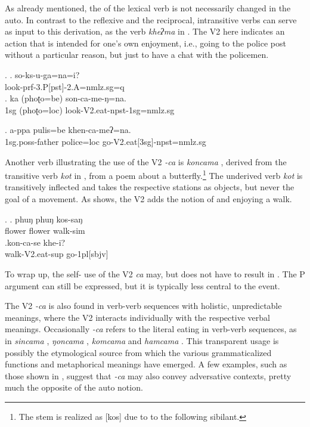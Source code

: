 As already mentioned, the  of the lexical verb is not necessarily changed in the auto. In contrast to the reflexive and the reciprocal,  intransitive verbs can serve as input to this derivation, as the verb \emph{kheʔma}  in \NNext. The V2 here indicates an action that is intended for one's own enjoyment, i.e., going to the police post without a particular reason, but just to have a chat with the policemen.

\ex. \ag.  so-ks-u-ga=na=i?\\
look{\sc -prf-3.P[pst]-2.A=nmlz.sg=q}\\
	\bg. ka (phoʈo=be) son-ca-me-ŋ=na.\\
	{\sc 1sg} (phoʈo{\sc =loc}) look{\sc -V2.eat-npst-1sg=nmlz.sg}\\


\exg. a-ppa pulis=be khen-ca-meʔ=na.\\
	{\sc 1sg.poss}-father police{\sc =loc} go{\sc -V2.eat[3sg]-npst=nmlz.sg}\\


Another verb illustrating the use of the V2 \emph{-ca} is \emph{koncama} , derived from the transitive verb \emph{kot}  in \Next[a], from a poem about a butterfly.\footnote{The stem is realized as [kos] due to  to the following sibilant.}  The underived verb \emph{kot} is transitively inflected and takes the respective stations as objects, but never the goal of a movement. As  \Next[b] shows, the V2 adds the notion of  and enjoying a walk.

	\ex. \ag. phuŋ  phuŋ  kos-saŋ\\
	flower flower walk{\sc -sim} \\
	 
\bg.kon-ca-se khe-i?\\
	walk-{\sc V2.eat-sup} go-{\sc 1pl[sbjv]}\\


To wrap up, the self- use of the V2 \emph{ca} may, but does not have to result in . The P argument can still be expressed, but it is typically less central to the event. 

The V2 \emph{-ca} is also found in verb-verb sequences with holistic, unpredictable meanings, where the V2 interacts individually with the respective verbal meanings. Occasionally \emph{-ca} refers to the literal eating in verb-verb sequences, as in \emph{sincama} , \emph{ŋoncama} , \emph{komcama}  and \emph{hamcama} . This transparent usage is possibly the etymological source from which the various grammaticalized functions and metaphorical meanings have  emerged. A few  examples, such as those shown in \Next, suggest that \emph{-ca} may also convey adversative contexts, pretty much the opposite of the auto notion. 

